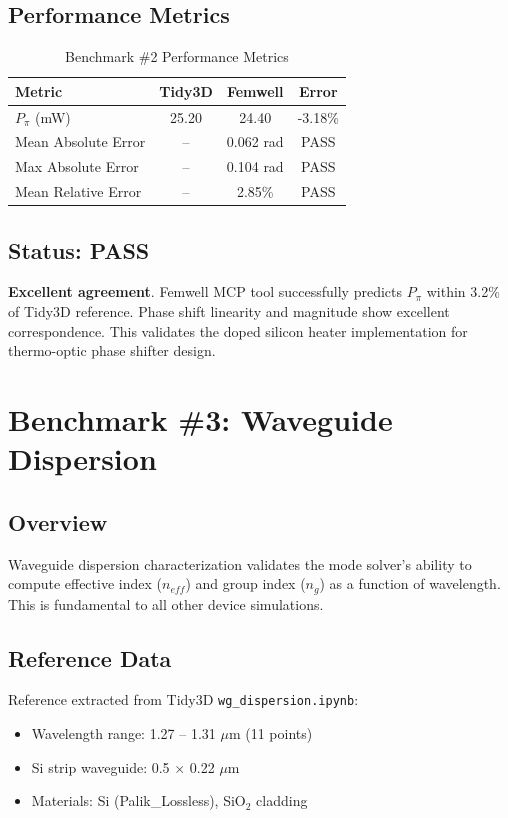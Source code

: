 \documentclass[11pt,a4paper]{article}
\begin{document}
\subsection{Performance Metrics}
\begin{table}[H]
\centering
\caption{Benchmark \#2 Performance Metrics}
\label{tab:doped_heater_results}
\begin{tabular}{lccc}
\toprule
\textbf{Metric} & \textbf{Tidy3D} & \textbf{Femwell} & \textbf{Error} \\
\midrule
$P_\pi$ (mW) & 25.20 & 24.40 & \textcolor{passgreen}{-3.18\%} \\
Mean Absolute Error & -- & 0.062 rad & \textcolor{passgreen}{PASS} \\
Max Absolute Error & -- & 0.104 rad & \textcolor{passgreen}{PASS} \\
Mean Relative Error & -- & 2.85\% & \textcolor{passgreen}{PASS} \\
\bottomrule
\end{tabular}
\end{table}

\subsection{Status: \textcolor{passgreen}{PASS}}
\textbf{Excellent agreement}. Femwell MCP tool successfully predicts $P_\pi$ within 3.2\% of Tidy3D reference. Phase shift linearity and magnitude show excellent correspondence. This validates the doped silicon heater implementation for thermo-optic phase shifter design.

\section{Benchmark \#3: Waveguide Dispersion}

\subsection{Overview}
Waveguide dispersion characterization validates the mode solver's ability to compute effective index ($n_{eff}$) and group index ($n_g$) as a function of wavelength. This is fundamental to all other device simulations.

\subsection{Reference Data}
Reference extracted from Tidy3D \texttt{wg\_dispersion.ipynb}:
\begin{itemize}
    \item Wavelength range: 1.27 -- 1.31 $\mu$m (11 points)
    \item Si strip waveguide: 0.5 $\times$ 0.22 $\mu$m
    \item Materials: Si (Palik\_Lossless), SiO$_2$ cladding
\end{itemize}
\end{document}
